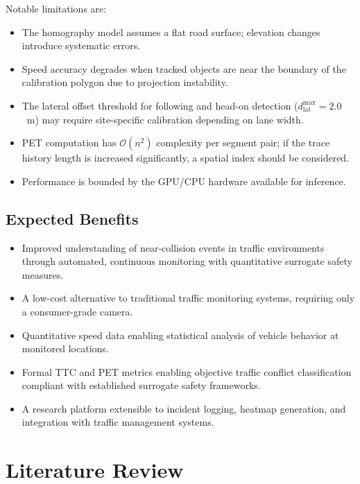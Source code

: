 \documentclass[12pt]{report}
\begin{document}
Notable limitations are:

\begin{itemize}
    \item The homography model assumes a flat road surface; elevation changes introduce systematic errors.
    \item Speed accuracy degrades when tracked objects are near the boundary of the calibration polygon due to projection instability.
    \item The lateral offset threshold for following and head-on detection ($d_\text{lat}^\text{max} = 2.0$~m) may require site-specific calibration depending on lane width.
    \item PET computation has $\mathcal{O}(n^2)$ complexity per segment pair; if the trace history length is increased significantly, a spatial index should be considered.
    \item Performance is bounded by the GPU/CPU hardware available for inference.
\end{itemize}

\section{Expected Benefits}

\begin{itemize}
    \item Improved understanding of near-collision events in traffic environments through automated, continuous monitoring with quantitative surrogate safety measures.
    \item A low-cost alternative to traditional traffic monitoring systems, requiring only a consumer-grade camera.
    \item Quantitative speed data enabling statistical analysis of vehicle behavior at monitored locations.
    \item Formal TTC and PET metrics enabling objective traffic conflict classification compliant with established surrogate safety frameworks.
    \item A research platform extensible to incident logging, heatmap generation, and integration with traffic management systems.
\end{itemize}

\chapter{Literature Review}
\end{document}
